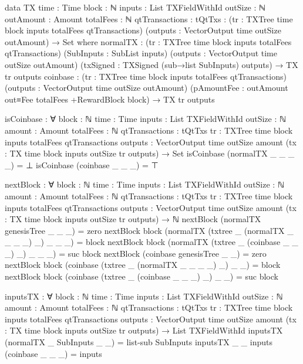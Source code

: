 \documentclass{beamer}
\begin{document}
\begin{code}
        data TX {time : Time} {block : ℕ} {inputs : List TXFieldWithId}
            {outSize : ℕ} {outAmount : Amount}
            {totalFees : ℕ} {qtTransactions : tQtTxs}
          : (tr : TXTree time block inputs totalFees qtTransactions)
            (outputs : VectorOutput time outSize outAmount) → Set where
          normalTX :
            (tr : TXTree time block inputs totalFees qtTransactions)
            (SubInputs : SubList inputs)
            (outputs : VectorOutput time outSize outAmount)
            (txSigned : TXSigned (sub→list SubInputs) outputs)
            → TX tr outputs
          coinbase :
            (tr : TXTree time block inputs totalFees qtTransactions)
            (outputs : VectorOutput time outSize outAmount)
            (pAmountFee : outAmount out≡Fee totalFees +RewardBlock block)
            → TX tr outputs

        isCoinbase : ∀ {block : ℕ} {time : Time}
          {inputs : List TXFieldWithId}
          {outSize : ℕ} {amount : Amount}
          {totalFees : ℕ} {qtTransactions : tQtTxs}
          {tr : TXTree time block inputs totalFees qtTransactions}
          {outputs : VectorOutput time outSize amount}
          (tx : TX {time} {block} {inputs} {outSize} tr outputs)
          → Set
        isCoinbase (normalTX _ _ _ _) = ⊥
        isCoinbase (coinbase _ _ _)     = ⊤

        nextBlock : ∀ {block : ℕ} {time : Time}
          {inputs : List TXFieldWithId}
          {outSize : ℕ} {amount : Amount}
          {totalFees : ℕ} {qtTransactions : tQtTxs}
          {tr : TXTree time block inputs totalFees qtTransactions}
          {outputs : VectorOutput time outSize amount}
          (tx : TX {time} {block} {inputs} {outSize} tr outputs)
          → ℕ
        nextBlock (normalTX genesisTree _ _ _) = zero
        nextBlock {block} (normalTX (txtree _ (normalTX _ _ _ _) _) _ _ _) = block
        nextBlock {block} (normalTX (txtree _ (coinbase _ _ _) _) _ _ _) = suc block
        nextBlock (coinbase genesisTree _ _) = zero
        nextBlock {block} (coinbase (txtree _ (normalTX _ _ _ _) _) _ _) = block
        nextBlock {block} (coinbase (txtree _ (coinbase _ _ _) _) _ _) = suc block

        inputsTX : ∀ {block : ℕ} {time : Time}
          {inputs : List TXFieldWithId}
          {outSize : ℕ} {amount : Amount}
          {totalFees : ℕ} {qtTransactions : tQtTxs}
          {tr : TXTree time block inputs totalFees qtTransactions}
          {outputs : VectorOutput time outSize amount}
          (tx : TX {time} {block} {inputs} {outSize} tr outputs)
          → List TXFieldWithId
        inputsTX (normalTX _ SubInputs _ _) = list-sub SubInputs
        inputsTX {_} {_} {inputs} (coinbase _ _ _) = inputs


\end{code}
\end{document}

